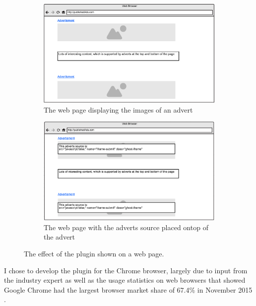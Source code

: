 \documentclass[12pt]{article}
\begin{document}
\begin{figure}[h]
    \begin{subfigure}{0.3\textwidth}
        \includegraphics[scale=0.25]{siteWithAds.png}
        \caption{The web page displaying the images of an advert}
        \label{fig:siteWithAds}
    \end{subfigure} \hspace{0.2\textwidth}
    \begin{subfigure}{0.3\textwidth}
        \includegraphics[scale=0.25]{siteWithAdSource.png}
        \caption{The web page with the adverts source placed ontop of the advert}
        \label{fig:siteWithAdSource}
    \end{subfigure}
    \caption{The effect of the plugin shown on a web page.}
    \label{fig:mockup}
\end{figure}

I chose to develop the plugin for the Chrome browser, largely due to input from the industry expert as well as the usage statistics on web browsers that showed Google Chrome had the largest browser market share of 67.4\% in November 2015 \parencite{browserStats}. \\
\end{document}
